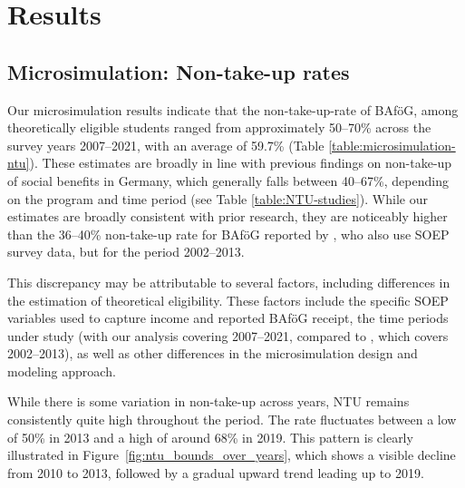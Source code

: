 %
%



\section{Results}
\subsection{Microsimulation: Non-take-up rates}

Our microsimulation results indicate that the non-take-up-rate of BAföG, among theoretically eligible students ranged from approximately 50--70\% across the survey years 2007--2021, with an average of 59.7\%  (Table \ref{table:microsimulation-ntu}). These estimates are broadly in line with previous findings on non-take-up of social benefits in Germany, which generally falls between 40--67\%, depending on the program and time period (see Table \ref{table:NTU-studies}). 
While our estimates are broadly consistent with prior research, they are noticeably higher than the 36--40\% non-take-up rate for BAföG reported by \cite{herber_non-take-up_2019}, who also use SOEP survey data, but for the period 2002--2013.




This discrepancy may be attributable to several factors, including differences in the estimation of theoretical eligibility. These factors include the specific SOEP variables used to capture income and reported BAföG receipt, the time periods under study (with our analysis covering 2007--2021, compared to \cite{herber_non-take-up_2019}, which covers 2002--2013), as well as other differences in the microsimulation design and modeling approach.


While there is some variation in non-take-up across years, NTU remains consistently quite high throughout the period. 
The rate fluctuates between a low of 50\% in 2013 and a high of around 68\% in 2019. 
This pattern is clearly illustrated in Figure~\ref{fig:ntu_bounds_over_years}, which shows a visible decline from 2010 to 2013, followed by a gradual upward trend leading up to 2019. 

